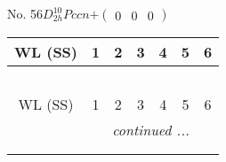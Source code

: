 \documentclass[fleqn,9pt,landscape]{jsarticle}
\begin{document}
\newpage
No. 56\quad$D_{2h}^{10}$\quad$Pccn$\quad[ orthorhombic ]\quad$+\begin{pmatrix} 0 & 0 & 0 \end{pmatrix}$
\begin{center}
\renewcommand{\arraystretch}{1.2}
\begin{longtable}{ccccccc}
 \hline \hline
WL (SS) & 1 & 2 & 3 & 4 & 5 & 6 \\ \hline \endfirsthead

\multicolumn{6}{l}{\tablename\ \thetable{}} \\
 \hline \hline
WL (SS) & 1 & 2 & 3 & 4 & 5 & 6 \\ \hline \endhead

 \hline \hline
\multicolumn{6}{r}{\footnotesize\it continued ...} \\ \endfoot

 \hline \hline
\multicolumn{6}{r}{} \\ \endlastfoot


\end{longtable}
\end{center}
\end{document}
